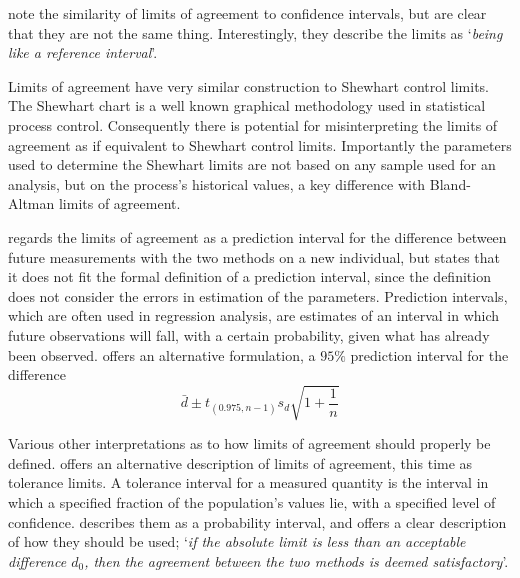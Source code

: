 \documentclass[12pt, a4paper]{report}
\theoremstyle{plain}
\theoremstyle{definition}
\theoremstyle{remark}
\begin{document}











\citet{BA99} note the similarity of limits of agreement to
confidence intervals, but are clear that they are not the same thing. Interestingly, they describe the limits as `\textit{being like a reference interval}'.

Limits of agreement have very similar construction to Shewhart control limits. The Shewhart chart is a well known graphical
methodology used in statistical process control. Consequently there is potential for misinterpreting the limits of agreement as if equivalent to Shewhart control limits. Importantly the
parameters used to determine the Shewhart limits are not based on any sample used for an analysis, but
on the process's historical values, a key difference with
Bland-Altman limits of agreement.

\citet{BXC2008} regards the limits of agreement as a prediction interval for the difference between future measurements with the two methods on a new individual, but states that it does not fit
the formal definition of a prediction interval, since the definition does not consider the errors in estimation of the
parameters. Prediction intervals, which are often used in regression analysis, are estimates of an interval in which future
observations will fall, with a certain probability, given what has already been observed. \citet{BXC2008} offers an alternative formulation, a $95\%$ prediction interval for the difference
\[
\bar{d} \pm t_{(0.975, n-1)}s_{d} \sqrt{1+\frac{1}{n}}
\]

Various other interpretations as to how limits of agreement should properly be defined. \citet{luiz} offers an alternative description of limits of agreement, this time as tolerance limits. A tolerance interval for a measured quantity is the interval in which a specified fraction
of the population's values lie, with a specified level of confidence. \citet{Barnhart} describes them as a probability interval, and offers a clear description of how they should be used; `\textit{if the absolute limit is less than an acceptable difference $d_{0}$, then the agreement between the two methods is deemed satisfactory}'.
\end{document}
